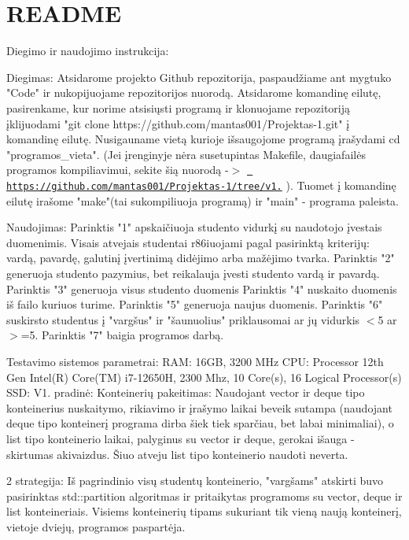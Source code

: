 \chapter{README}
\hypertarget{md__r_e_a_d_m_e}{}\label{md__r_e_a_d_m_e}
Diegimo ir naudojimo instrukcija\+:

Diegimas\+: Atsidarome projekto Github repozitorija, paspaudžiame ant mygtuko "{}\+Code"{} ir nukopijuojame repozitorijos nuorodą. Atsidarome komandinę eilutę, pasirenkame, kur norime atsisiųsti programą ir klonuojame repozitoriją įklijuodami "{}git clone https\+://github.\+com/mantas001/\+Projektas-\/1.\+git"{} į komandinę eilutę. Nusigauname vietą kurioje išsaugojome programą įrašydami cd "{}programos\+\_\+vieta"{}. (Jei įrenginyje nėra su\textquotesingle{}setup\textquotesingle{}intas Makefile, daugiafailės programos kompiliavimui, sekite šią nuorodą -\/\texorpdfstring{$>$}{>} \href{https://github.com/mantas001/Projektas-1/tree/v1.0}{\texttt{ https\+://github.\+com/mantas001/\+Projektas-\/1/tree/v1.}} ). Tuomet į komandinę eilutę irašome "{}make"{}(tai sukompiliuoja programą) ir "{}main"{} -\/ programa paleista.

Naudojimas\+: Parinktis "{}1"{} apskaičiuoja studento vidurkį su naudotojo įvestais duomenimis. Visais atvejais studentai r86iuojami pagal pasirinktą kriterijų\+: vardą, pavardę, galutinį įvertinimą didėjimo arba mažėjimo tvarka. Parinktis "{}2"{} generuoja studento pazymius, bet reikalauja įvesti studento vardą ir pavardą. Parinktis "{}3"{} generuoja visus studento duomenis Parinktis "{}4"{} nuskaito duomenis iš failo kuriuos turime. Parinktis "{}5"{} generuoja naujus duomenis. Parinktis "{}6"{} suskirsto studentus į "{}vargšus"{} ir "{}šaunuolius"{} priklausomai ar jų vidurkis \texorpdfstring{$<$}{<}5 ar \texorpdfstring{$>$}{>}=5. Parinktis "{}7"{} baigia programos darbą.

 Testavimo sistemos parametrai\+: RAM\+: 16GB, 3200 MHz CPU\+: Processor 12th Gen Intel(\+R) Core(\+TM) i7-\/12650H, 2300 Mhz, 10 Core(s), 16 Logical Processor(s) SSD\+: 
 V1. pradinė\+: Konteinerių pakeitimas\+: Naudojant vector ir deque tipo konteinerius nuskaitymo, rikiavimo ir įrašymo laikai beveik sutampa (naudojant deque tipo konteinerį programa dirba šiek tiek sparčiau, bet labai minimaliai), o list tipo konteinerio laikai, palyginus su vector ir deque, gerokai išauga -\/ skirtumas akivaizdus. Šiuo atveju list tipo konteinerio naudoti neverta.

2 strategija\+: Iš pagrindinio visų studentų konteinerio, "{}vargšams"{} atskirti buvo pasirinktas std\+::partition algoritmas ir pritaikytas programoms su vector, deque ir list konteineriais. Visiems konteinerių tipams sukuriant tik vieną naują konteinerį, vietoje dviejų, programos paspartėja.

